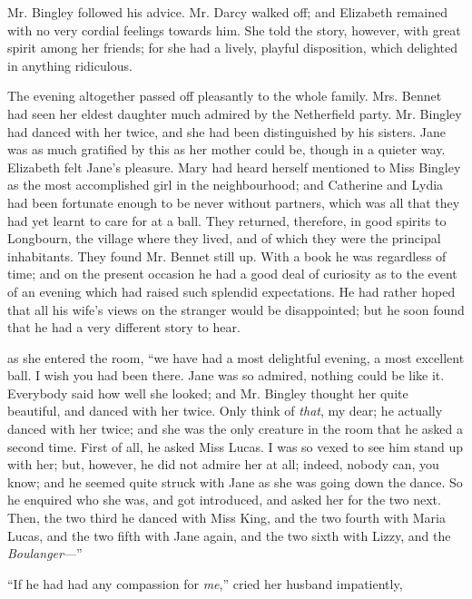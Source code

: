 Mr. Bingley followed his advice. Mr. Darcy walked off; and Elizabeth remained with no very cordial feelings towards him. She told the story, however, with great spirit among her friends; for she had a lively, playful disposition, which delighted in anything ridiculous.

The evening altogether passed off pleasantly to the whole family. Mrs. Bennet had seen her eldest daughter much admired by the Netherfield party. Mr. Bingley had danced with her twice, and she had been distinguished by his sisters. Jane was as much gratified by this as her mother could be, though in a quieter way. Elizabeth felt Jane's pleasure. Mary had heard herself mentioned to Miss Bingley as the most accomplished girl in the neighbourhood; and Catherine and Lydia had been fortunate enough to be never without partners, which was all that they had yet learnt to care for at a ball. They returned, therefore, in good spirits to Longbourn, the village where they lived, and of which they were the principal inhabitants. They found Mr. Bennet still up. With a book he was regardless of time; and on the present occasion he had a good deal of curiosity as to the event of an evening which had raised such splendid expectations. He had rather hoped that all his wife's views on the stranger would be disappointed; but he soon found that he had a very different story to hear.

 as she entered the room, “we have had a most delightful evening, a most excellent ball. I wish you had been there. Jane was so admired, nothing could be like it. Everybody said how well she looked; and Mr. Bingley thought her quite beautiful, and danced with her twice. Only think of {\em that}, my dear; he actually danced with her twice; and she was the only creature in the room that he asked a second time. First of all, he asked Miss Lucas. I was so vexed to see him stand up with her; but, however, he did not admire her at all; indeed, nobody can, you know; and he seemed quite struck with Jane as she was going down the dance. So he enquired who she was, and got introduced, and asked her for the two next. Then, the two third he danced with Miss King, and the two fourth with Maria Lucas, and the two fifth with Jane again, and the two sixth with Lizzy, and the {\em Boulanger}---”

“If he had had any compassion for {\em me},” cried her husband impatiently, 

